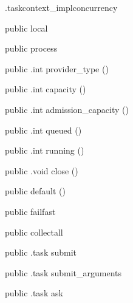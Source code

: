 \begin{CrexxClass}{.taskcontext\_impl}{concurrency}

  \begin{Hierarchy}
  \end{Hierarchy}

  \begin{Members}

    \Factory
      {public}
      {local}
      {}

    \Factory
      {public}
      {process}
      {}

    \Method
      {public}
      {.int}
      {provider\_type}
      {()}

    \Method
      {public}
      {.int}
      {capacity}
      {()}

    \Method
      {public}
      {.int}
      {admission\_capacity}
      {()}

    \Method
      {public}
      {.int}
      {queued}
      {()}

    \Method
      {public}
      {.int}
      {running}
      {()}

    \Method
      {public}
      {.void}
      {close}
      {()}

    \Factory
      {public}
      {default}
      {()}

    \Factory
      {public}
      {failfast}
      {}

    \Factory
      {public}
      {collectall}
      {}

    \Method
      {public}
      {.task}
      {submit}
      {}

    \Method
      {public}
      {.task}
      {submit\_arguments}
      {}

    \Method
      {public}
      {.task}
      {ask}
      {}


\end{Members}
\end{CrexxClass}
